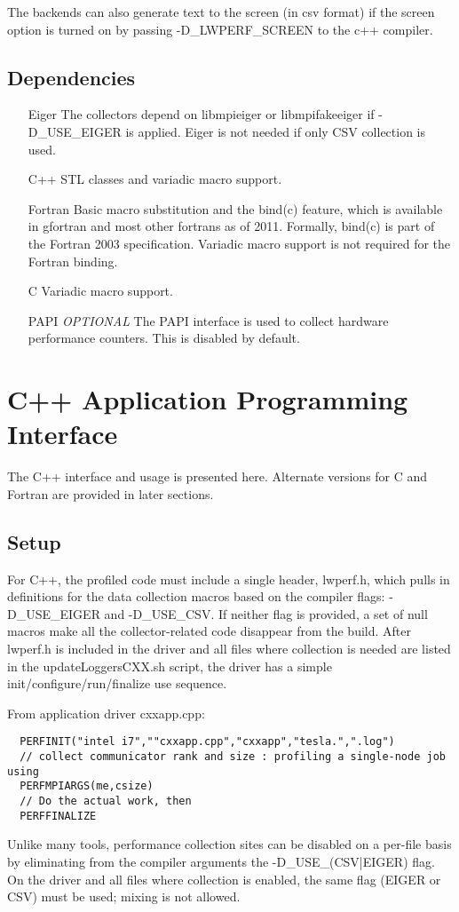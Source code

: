 \documentclass{article}
\begin{document}
The backends can also generate text to the screen (in csv format) if the screen option is turned on by passing -D\_LWPERF\_SCREEN to the c++ compiler.


\subsection{Dependencies}
\begin{itemize}
\item[Eiger] The collectors depend on libmpieiger or libmpifakeeiger if -D\_USE\_EIGER is applied. Eiger is not needed if only CSV collection is used.
\item[C++] STL classes and variadic macro support.
\item[Fortran] Basic macro substitution and the bind(c) feature, which is available in gfortran and most other fortrans as of 2011. Formally, bind(c) is part of the Fortran 2003 specification. Variadic macro support is not required for the Fortran binding.
\item[C] Variadic macro support.
\item[PAPI] \textit{OPTIONAL} The PAPI interface is used to collect hardware performance counters. This is disabled by default.
\end{itemize}

\section{C++ Application Programming Interface}
The C++ interface and usage is presented here. Alternate versions for C and Fortran are provided in later sections.
\label{sec:api}
\subsection{Setup}
For C++, the profiled code must include a single header, lwperf.h, which pulls in definitions for the data collection macros based on the compiler flags: -D\_USE\_EIGER and -D\_USE\_CSV. If neither flag is provided, a set of null macros make all the collector-related code disappear from the build.
After lwperf.h is included in the driver and all files where collection is needed are listed in the updateLoggersCXX.sh script, the driver has a simple init/configure/run/finalize use sequence. 

From application driver cxxapp.cpp:
\begin{verbatim}
  PERFINIT("intel i7",""cxxapp.cpp","cxxapp","tesla.",".log")
  // collect communicator rank and size : profiling a single-node job using
  PERFMPIARGS(me,csize)
  // Do the actual work, then
  PERFFINALIZE
\end{verbatim}
Unlike many tools, performance collection sites can be disabled on a per-file basis by eliminating from the compiler arguments the -D\_USE\_(CSV|EIGER) flag. On the driver and all files where collection is enabled, the same flag (EIGER or CSV) must be used; mixing is not allowed. 
\end{document}
